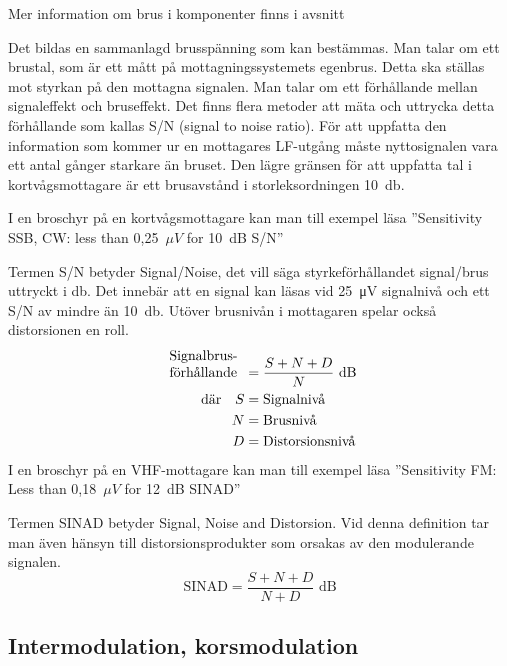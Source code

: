 Mer information om brus i komponenter finns i avsnitt~

Det bildas en sammanlagd brusspänning som kan bestämmas.
Man talar om ett brustal, som är ett mått på mottagningssystemets egenbrus.
Detta ska ställas mot styrkan på den mottagna signalen.
Man talar om ett förhållande mellan signaleffekt och bruseffekt.
Det finns flera metoder att mäta och uttrycka detta förhållande som kallas
S/N (signal to noise ratio).
För att uppfatta den information som kommer ur en mottagares LF-utgång måste
nyttosignalen vara ett antal gånger starkare än bruset.
Den lägre gränsen för att uppfatta tal i kortvågsmottagare är ett brusavstånd
i storleksordningen \qty{10}{\decibel}.



I en broschyr på en kortvågsmottagare kan man till exempel läsa
''Sensitivity SSB, CW: less than 0,25~\(\mu V\) for 10~dB S/N''

Termen S/N betyder Signal/Noise, det vill säga styrkeförhållandet signal/brus
uttryckt i \unit{\decibel}.
Det innebär att en signal kan läsas vid \qty{25}{\micro\volt} signalnivå och ett
S/N av mindre än \qty{10}{\decibel}.
Utöver brusnivån i mottagaren spelar också distorsionen en roll.
\begin{align*}
  \begin{array}[b]{l}
    \text{Signalbrus-} \\
    \text{förhållande}
  \end{array} &= \frac{S + N + D}{N} \text{ dB} \\
  \text{där} \quad S &= \text{Signalnivå} \\
  N &= \text{Brusnivå} \\
  D &= \text{Distorsionsnivå} \\
\end{align*}
I en broschyr på en VHF-mottagare kan man till exempel läsa
''Sensitivity FM: Less than 0,18~\(\mu V\) for 12~dB SINAD''

Termen SINAD betyder Signal, Noise and Distorsion.
Vid denna definition tar man även hänsyn till distorsionsprodukter som orsakas
av den modulerande signalen.
\[
\text{SINAD} = \frac{S+N+D}{N+D}\text{ dB}
\]

\subsection{Intermodulation, korsmodulation}
\label{intermodulation}

